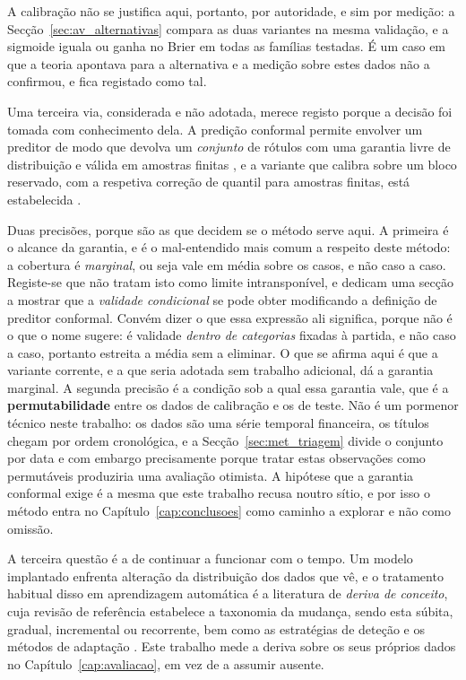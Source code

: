 A calibração não se justifica aqui, portanto, por autoridade, e sim por medição: a
Secção~\ref{sec:av_alternativas} compara as duas variantes na mesma validação, e a sigmoide iguala ou
ganha no Brier em todas as famílias testadas. É um caso em que a teoria apontava para a alternativa e
a medição sobre estes dados não a confirmou, e fica registado como tal.

Uma terceira via, considerada e não adotada, merece registo porque a decisão foi tomada com
conhecimento dela. A predição conformal permite envolver um preditor de modo que devolva um
\emph{conjunto} de rótulos com uma garantia livre de distribuição e válida em amostras finitas
\autocite{vovk2005algorithmic}, e a variante que calibra sobre um bloco reservado, com a respetiva
correção de quantil para amostras finitas, está estabelecida \autocite{angelopoulos2023conformal}.

Duas precisões, porque são as que decidem se o método serve aqui. A primeira é o alcance da garantia,
e é o mal-entendido mais comum a respeito deste método: a cobertura é \emph{marginal}, ou seja vale
em média sobre os casos, e não caso a caso. Registe-se que \textcite{vovk2005algorithmic} não tratam isto
como limite intransponível, e dedicam uma secção a mostrar que a \emph{validade condicional} se pode
obter modificando a definição de preditor conformal. Convém dizer o que essa expressão ali
significa, porque não é o que o nome sugere: é validade \emph{dentro de categorias} fixadas à
partida, e não caso a caso, portanto estreita a média sem a eliminar. O que se afirma aqui é que a
variante corrente, e a que seria adotada sem trabalho adicional, dá a garantia marginal. A segunda precisão é a condição sob a qual
essa garantia vale, que é a
\textbf{permutabilidade} entre os dados de calibração e os de teste. Não é um pormenor técnico neste
trabalho: os dados são uma série temporal financeira, os títulos chegam por ordem cronológica, e a
Secção~\ref{sec:met_triagem} divide o conjunto por data e com embargo precisamente porque tratar
estas observações como permutáveis produziria uma avaliação otimista. A hipótese que a garantia
conformal exige é a mesma que este trabalho recusa noutro sítio, e por isso o método entra no
Capítulo~\ref{cap:conclusoes} como caminho a explorar e não como omissão.

A terceira questão é a de continuar a funcionar com o tempo. Um modelo implantado enfrenta alteração
da distribuição dos dados que vê, e o tratamento habitual disso em aprendizagem automática é a
literatura de \emph{deriva de conceito}, cuja revisão de referência estabelece a taxonomia da
mudança, sendo esta súbita, gradual, incremental ou recorrente, bem como as estratégias de deteção e
os métodos de adaptação \autocite{gama2014survey}. Este trabalho mede a deriva sobre os seus próprios
dados no Capítulo~\ref{cap:avaliacao}, em vez de a assumir ausente.

